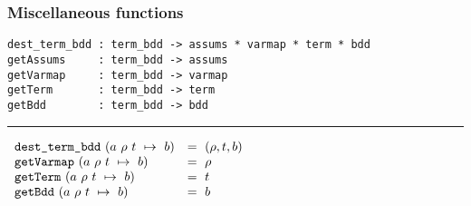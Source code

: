 \subsubsection{Miscellaneous functions}\label{misc}


\noindent \newsavebox\destructors
\begin{lrbox}\destructors
\begin{minipage}{\minipagewidth}

\begin{footnotesize}
\begin{verbatim}
dest_term_bdd : term_bdd -> assums * varmap * term * bdd
getAssums     : term_bdd -> assums
getVarmap     : term_bdd -> varmap
getTerm       : term_bdd -> term
getBdd        : term_bdd -> bdd
\end{verbatim}
\end{footnotesize}
\vspace*{-6mm}

\noindent \rule\minipagewidth{0.1pt}

\vspace*{1mm}

\begin{footnotesize}
\hspace*{-1.5mm}$\begin{array}{ll}
\mbox{\tt dest\_term\_bdd}~(\mbox{$a~\rho~t~\mapsto~b$})&=~(\rho, t, b)\\
\mbox{\tt getVarmap}~(\mbox{$a~\rho~t~\mapsto~b$})&=~\rho\\
\mbox{\tt getTerm}~(\mbox{$a~\rho~t~\mapsto~b$})&=~t\\
\mbox{\tt getBdd}~(\mbox{$a~\rho~t~\mapsto~b$})&=~b
\end{array}$
\end{footnotesize}
\end{minipage}
\end{lrbox}
\fbox{\usebox{\destructors}}

\bigskip

\noindent \newsavebox\inSupport
{}
\fbox{\usebox{\inSupport}}

